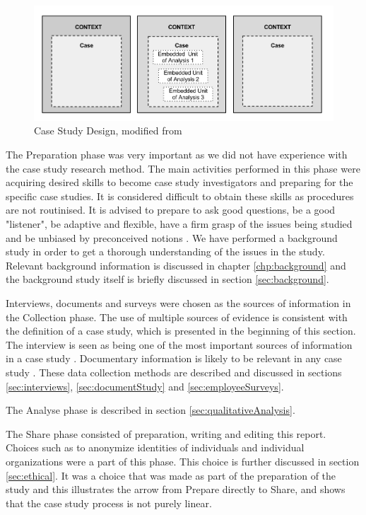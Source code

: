 \begin{figure}[ht]
\hspace{-0.28cm}\includegraphics[scale=0.375]{caseStructure.png}
\caption[Case Design for This Study]{Case Study Design, modified from \cite{CaseStudyResearch}}
\label{fig:caseDesign}
\end{figure}

The Preparation phase was very important as we did not have experience with the case study research method. The main activities performed in this phase were acquiring desired skills to become case study investigators and preparing for the specific case studies. It is considered difficult to obtain these skills as procedures are not routinised. It is advised to prepare to ask good questions, be a good "listener", be adaptive and flexible, have a firm grasp of the issues being studied and be unbiased by preconceived notions \cite{CaseStudyResearch}. We have performed a background study in order to get a thorough understanding of the issues in the study. Relevant background information is discussed in chapter \ref{chp:background} and the background study itself is briefly discussed in section \ref{sec:background}. %

Interviews, documents and surveys were chosen as the sources of information in the Collection phase. The use of multiple sources of evidence is consistent with the definition of a case study, which is presented in the beginning of this section. The interview is seen as being one of the most important sources of information in a case study \cite{CaseStudyResearch}. Documentary information is likely to be relevant in any case study \cite{CaseStudyResearch}. These data collection methods are described and discussed in sections \ref{sec:interviews}, \ref{sec:documentStudy} and \ref{sec:employeeSurveys}.

The Analyse phase is described in section \ref{sec:qualitativeAnalysis}.

The Share phase consisted of preparation, writing and editing this report. Choices such as to anonymize identities of individuals and individual organizations were a part of this phase. This choice is further discussed in section \ref{sec:ethical}. It was a choice that was made as part of the preparation of the study and this illustrates the arrow from Prepare directly to Share, and shows that the case study process is not purely linear. 